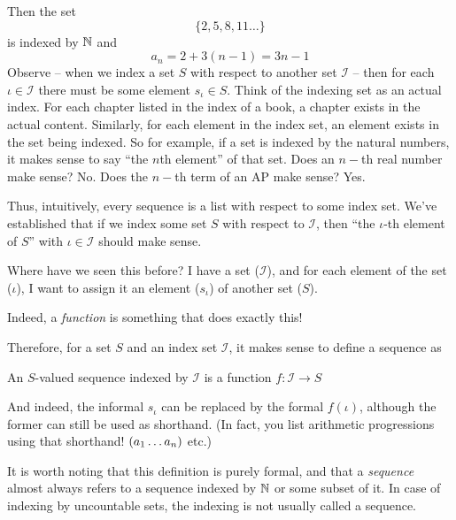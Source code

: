 Then the set
$$
\{2, 5, 8, 11 \dots\}
$$
is indexed by $\mathbb{N}$ and
$$a_n = 2 + 3(n - 1) = 3n -1$$
Observe -- when we index a set $S$ with respect to another set $\mathcal I$ -- then for each $\iota \in \mathcal I$ there must be some element $s_\iota \in S$. Think of the indexing set as an actual index. For each chapter listed in the index of a book, a chapter exists in the actual content. Similarly, for each element in the index set, an element exists in the set being indexed. So for example, if a set is indexed by the natural numbers, it makes sense to say ``the $n$th element'' of that set. Does an $n-$th real number make sense? No. Does the $n-$th term of an AP make sense? Yes.

Thus, intuitively, every sequence is a list with respect to some index set. We've established that if we index some set $S$ with respect to $\mathcal I$, then ``the $\iota$-th element of $S$'' with $\iota \in \mathcal I$ should make sense.

Where have we seen this before? I have a set ($\mathcal I$), and for each element of the set ($\iota$), I want to assign it an element ($s_\iota$) of another set ($S$).

Indeed, a \emph{function} is something that does exactly this!

Therefore, for a set $S$ and an index set $\mathcal I$, it makes sense to define a sequence as
\begin{SNP}{\dfn
}{An $S$-valued sequence indexed by $\mathcal I$ is a function $f: \mathcal I \rightarrow S$
}
\end{SNP}

And indeed, the informal $s_\iota$ can be replaced by the formal $f(\iota)$, although the former can still be used as shorthand. (In fact, you list arithmetic progressions using that shorthand! $({a}_1 \dots {a}_{n})$ etc.)

It is worth noting that this definition is purely formal, and that a \textit{sequence} almost always refers to a sequence indexed by $\mathbb{N}$ or some subset of it. In case of indexing by uncountable sets, the indexing is not usually called a sequence.
